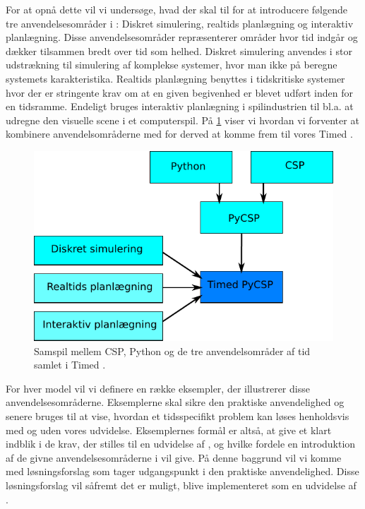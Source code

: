 For at opnå dette vil vi undersøge, hvad der skal til for at introducere følgende tre anvendelsesområder i \pycsp: Diskret simulering, realtids planlægning og interaktiv planlægning. Disse anvendelsesområder repræsenterer områder hvor tid indgår  og dækker tilsammen bredt over tid som helhed. Diskret simulering anvendes i stor udstrækning til simulering af komplekse systemer, hvor man ikke på beregne  systemets karakteristika. Realtids planlægning benyttes i tidskritiske systemer hvor der er stringente krav om at en given begivenhed er blevet udført inden for en tidsramme. Endeligt bruges interaktiv planlægning i spilindustrien til bl.a. at udregne den visuelle scene i et computerspil. På \cref{fig:intro} viser vi hvordan vi forventer at kombinere anvendelsområderne med \pycsp for derved at komme frem til vores Timed \pycsp. 

\begin{figure}[htp]
 \begin{center}
  \includegraphics[scale=0.8]{images/intro}
	\caption{Samspil mellem CSP, Python og de tre anvendelsområder af tid samlet i Timed \pycsp .}
	\label{fig:intro}
\end{center}
\end{figure}

For hver model vil vi definere en række eksempler, der illustrerer disse anvendelsesområderne. Eksemplerne skal sikre den praktiske anvendelighed og senere bruges til at vise, hvordan et tidsspecifikt problem kan løses henholdsvis med og uden vores udvidelse. Eksemplernes formål er altså, at give et klart indblik i de krav, der stilles til en udvidelse af \pycsp, og hvilke fordele en introduktion af de givne anvendelsesområderne i \pycsp vil give. På denne baggrund vil vi komme med løsningsforslag som tager udgangspunkt i den praktiske anvendelighed. Disse løsningsforslag vil såfremt det er muligt, blive implementeret som en udvidelse af \pycsp.

